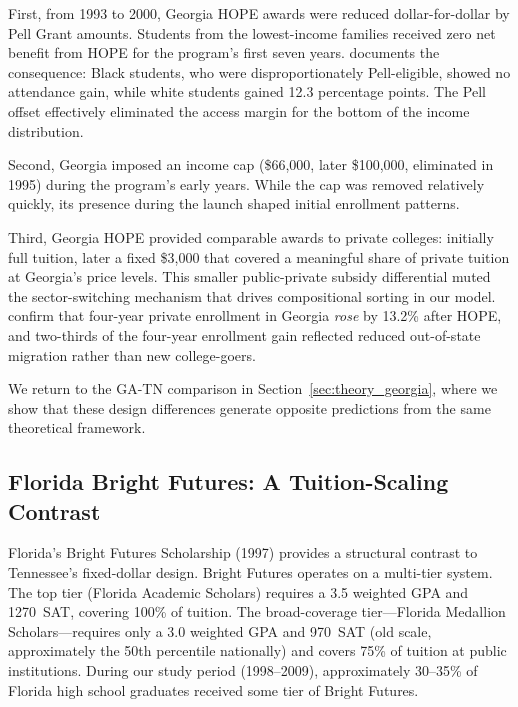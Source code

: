 First, from 1993 to 2000, Georgia HOPE awards were reduced
dollar-for-dollar by Pell Grant amounts. Students from the
lowest-income families received zero net benefit from HOPE for the
program's first seven years. \textcite{dynarski2000hope} documents the
consequence: Black students, who were disproportionately Pell-eligible,
showed no attendance gain, while white students gained 12.3 percentage
points. The Pell offset effectively eliminated the access margin for
the bottom of the income distribution.

Second, Georgia imposed an income cap (\$66,000, later \$100,000,
eliminated in 1995) during the program's early years. While the cap
was removed relatively quickly, its presence during the launch shaped
initial enrollment patterns.

Third, Georgia HOPE provided comparable awards to private colleges:
initially full tuition, later a fixed \$3,000 that covered a
meaningful share of private tuition at Georgia's price levels. This
smaller public-private subsidy differential muted the sector-switching
mechanism that drives compositional sorting in our model. \textcite{cornwell2006enrollment} confirm that four-year private enrollment in
Georgia \emph{rose} by 13.2\% after HOPE, and two-thirds of the
four-year enrollment gain reflected reduced out-of-state migration
rather than new college-goers.

We return to the GA-TN comparison in Section~\ref{sec:theory_georgia},
where we show that these design differences generate opposite
predictions from the same theoretical framework.

\subsection{Florida Bright Futures: A Tuition-Scaling Contrast}
\label{sec:background_florida}

Florida's Bright Futures Scholarship (1997) provides a structural
contrast to Tennessee's fixed-dollar design. Bright Futures operates
on a multi-tier system. The top tier (Florida Academic Scholars)
requires a 3.5 weighted GPA and 1270~SAT, covering 100\% of tuition.
The broad-coverage tier---Florida Medallion Scholars---requires only
a 3.0 weighted GPA and 970~SAT (old scale, approximately the 50th
percentile nationally) and covers 75\% of tuition at public
institutions. During our study period (1998--2009), approximately
30--35\% of Florida high school graduates received some tier of
Bright Futures.

